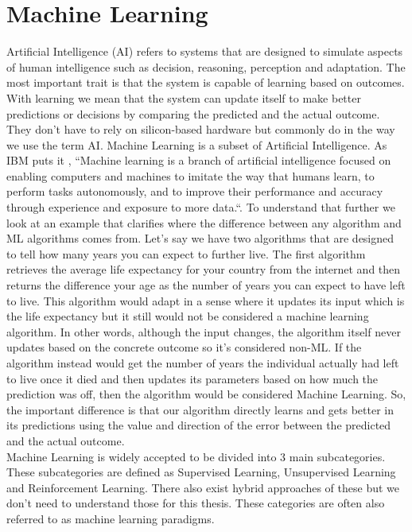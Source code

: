 \documentclass[a4paper,12pt]{report}
\begin{document}
\chapter{Machine Learning}
Artificial Intelligence (AI) refers to systems that are designed to simulate aspects of human intelligence such as decision, reasoning, perception and adaptation. The most important trait is that the system is capable of learning based on outcomes. With learning we mean that the system can update itself to make better predictions or decisions by comparing the predicted and the actual outcome. They don’t have to rely on silicon-based hardware but commonly do in the way we use the term AI. Machine Learning is a subset of Artificial Intelligence. As IBM puts it \cite{48}, “Machine learning is a branch of artificial intelligence focused on enabling computers and machines to imitate the way that humans learn, to perform tasks autonomously, and to improve their performance and accuracy through experience and exposure to more data.“. To understand that further we look at an example that clarifies where the difference between any algorithm and ML algorithms comes from. Let’s say we have two algorithms that are designed to tell how many years you can expect to further live. The first algorithm retrieves the average life expectancy for your country from the internet and then returns the difference your age as the number of years you can expect to have left to live. This algorithm would adapt in a sense where it updates its input which is the life expectancy but it still would not be considered a machine learning algorithm. In other words, although the input changes, the algorithm itself never updates based on the concrete outcome so it's considered non-ML. If the algorithm instead would get the number of years the individual actually had left to live once it died and then updates its parameters based on how much the prediction was off, then the algorithm would be considered Machine Learning. So, the important difference is that our algorithm directly learns and gets better in its predictions using the value and direction of the error between the predicted and the actual outcome.\\

Machine Learning is widely accepted to be divided into 3 main subcategories. These subcategories are defined as Supervised Learning, Unsupervised Learning and Reinforcement Learning. There also exist hybrid approaches of these but we don't need to understand those for this thesis. These categories are often also referred to as machine learning paradigms. 
\end{document}
